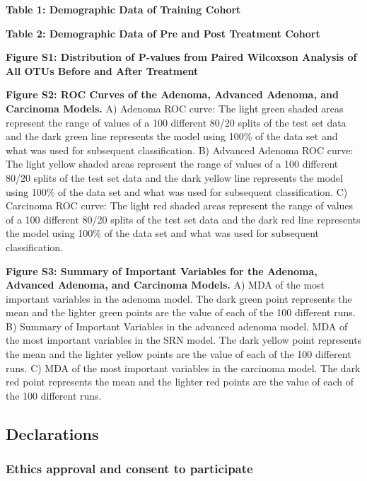 \documentclass[12pt,]{article}
\begin{document}
\newpage

\textbf{Table 1: Demographic Data of Training Cohort}

\textbf{Table 2: Demographic Data of Pre and Post Treatment Cohort}

\newpage

\textbf{Figure S1: Distribution of P-values from Paired Wilcoxson
Analysis of All OTUs Before and After Treatment}

\textbf{Figure S2: ROC Curves of the Adenoma, Advanced Adenoma, and
Carcinoma Models.} A) Adenoma ROC curve: The light green shaded areas
represent the range of values of a 100 different 80/20 splits of the
test set data and the dark green line represents the model using 100\%
of the data set and what was used for subsequent classification. B)
Advanced Adenoma ROC curve: The light yellow shaded areas represent the
range of values of a 100 different 80/20 splits of the test set data and
the dark yellow line represents the model using 100\% of the data set
and what was used for subsequent classification. C) Carcinoma ROC curve:
The light red shaded areas represent the range of values of a 100
different 80/20 splits of the test set data and the dark red line
represents the model using 100\% of the data set and what was used for
subsequent classification.

\textbf{Figure S3: Summary of Important Variables for the Adenoma,
Advanced Adenoma, and Carcinoma Models.} A) MDA of the most important
variables in the adenoma model. The dark green point represents the mean
and the lighter green points are the value of each of the 100 different
runs. B) Summary of Important Variables in the advanced adenoma model.
MDA of the most important variables in the SRN model. The dark yellow
point represents the mean and the lighter yellow points are the value of
each of the 100 different runs. C) MDA of the most important variables
in the carcinoma model. The dark red point represents the mean and the
lighter red points are the value of each of the 100 different runs.

\newpage

\subsection{Declarations}\label{declarations}

\subsubsection{Ethics approval and consent to
participate}\label{ethics-approval-and-consent-to-participate}
\end{document}

